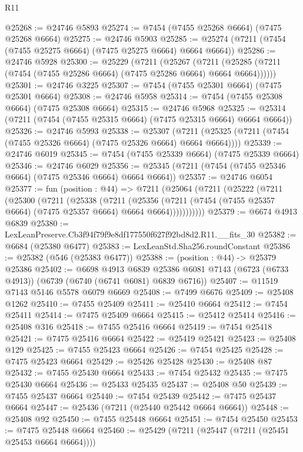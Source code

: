 \begin{lexlean}{R11}
\begin{coremodule}
@25268 := @24746 @5893
@25274 := @7454 (@7455 @25268 @6664) (@7475 @25268 @6664)
@25275 := @24746 @5903
@25285 := @25274 (@7211 (@7454 (@7455 @25275 @6664) (@7475 @25275 @6664) @6664 @6664))
@25286 := @24746 @5928
@25300 := @25229
    (@7211
      (@25267
        (@7211 (@25285 (@7211 (@7454 (@7455 @25286 @6664) (@7475 @25286 @6664) @6664 @6664))))))
@25301 := @24746 @3225
@25307 := @7454 (@7455 @25301 @6664) (@7475 @25301 @6664)
@25308 := @24746 @5958
@25314 := @7454 (@7455 @25308 @6664) (@7475 @25308 @6664)
@25315 := @24746 @5968
@25325 := @25314 (@7211 (@7454 (@7455 @25315 @6664) (@7475 @25315 @6664) @6664 @6664))
@25326 := @24746 @5993
@25338 := @25307
    (@7211 (@25325 (@7211 (@7454 (@7455 @25326 @6664) (@7475 @25326 @6664) @6664 @6664))))
@25339 := @24746 @6019
@25345 := @7454 (@7455 @25339 @6664) (@7475 @25339 @6664)
@25346 := @24746 @6029
@25356 := @25345 (@7211 (@7454 (@7455 @25346 @6664) (@7475 @25346 @6664) @6664 @6664))
@25357 := @24746 @6054
@25377 := fun (position : @44) =>
  @7211
    (@25064
      (@7211
        (@25222
          (@7211
            (@25300
              (@7211
                (@25338
                  (@7211
                    (@25356
                      (@7211 (@7454 (@7455 @25357 @6664) (@7475 @25357 @6664) @6664 @6664)))))))))))
@25379 := @6674 @4913 @6839
@25380 := LexLeanPreserve.Cb3f94f79f9e8df177550f627f92bd8d2.R11.__fits_30
@25382 := @6684 (@25380 @6477)
@25383 := LexLeanStd.Sha256.roundConstant
@25386 := @25382 (@546 (@25383 @6477))
@25388 := (position : @44) -> @25379 @25386
@25402 := @6698
    @4913
    @6839
    @25386
    @6081
    @7143
    (@6723 (@6733 @4913))
    (@6739 (@6740 (@6741 @6081) @6839 @6716))
@25407 := @11519 @7143 @5146 @5578 @6079 @6669
@25408 := @7499 @6676
@25409 := @25408 @1262
@25410 := @7455 @25409
@25411 := @25410 @6664
@25412 := @7454 @25411
@25414 := @7475 @25409 @6664
@25415 := @25412 @25414
@25416 := @25408 @316
@25418 := @7455 @25416 @6664
@25419 := @7454 @25418
@25421 := @7475 @25416 @6664
@25422 := @25419 @25421
@25423 := @25408 @129
@25425 := @7455 @25423 @6664
@25426 := @7454 @25425
@25428 := @7475 @25423 @6664
@25429 := @25426 @25428
@25430 := @25408 @87
@25432 := @7455 @25430 @6664
@25433 := @7454 @25432
@25435 := @7475 @25430 @6664
@25436 := @25433 @25435
@25437 := @25408 @50
@25439 := @7455 @25437 @6664
@25440 := @7454 @25439
@25442 := @7475 @25437 @6664
@25447 := @25436 (@7211 (@25440 @25442 @6664 @6664))
@25448 := @25408 @92
@25450 := @7455 @25448 @6664
@25451 := @7454 @25450
@25453 := @7475 @25448 @6664
@25460 := @25429 (@7211 (@25447 (@7211 (@25451 @25453 @6664 @6664))))

\end{coremodule}
\end{lexlean}
